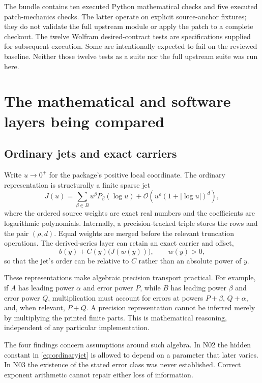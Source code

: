 \documentclass[11pt,letterpaper]{article}
\newcommand{\OO}{\mathcal O}
\begin{document}
The bundle contains ten executed Python mathematical checks and five executed patch-mechanics checks. The latter operate on explicit source-anchor fixtures; they do not validate the full upstream module or apply the patch to a complete checkout. The twelve Wolfram desired-contract tests are specifications supplied for subsequent execution. Some are intentionally expected to fail on the reviewed baseline. Neither those twelve tests as a suite nor the full upstream suite was run here.

\section{The mathematical and software layers being compared}
\subsection{Ordinary jets and exact carriers}
Write $u\to0^+$ for the package's positive local coordinate. The ordinary representation is structurally a finite sparse jet
\begin{equation}\label{eq:ordinaryjet}
 J(u)=\sum_{\beta\in B}u^\beta P_\beta(\log u)
       +\OO\!\left(u^\rho(1+|\log u|)^d\right),
\end{equation}
where the ordered source weights are exact real numbers and the coefficients are logarithmic polynomials. Internally, a precision-tracked triple stores the rows and the pair $(\rho,d)$. Equal weights are merged before the relevant truncation operations. The derived-series layer can retain an exact carrier and offset,
\begin{equation}\label{eq:carrier}
 b(y)+C(y)\bigl(J(w(y))\bigr),\qquad w(y)>0,
\end{equation}
so that the jet's order can be relative to $C$ rather than an absolute power of $y$.\cite{core,operations}

These representations make algebraic precision transport practical. For example, if $A$ has leading power $\alpha$ and error power $P$, while $B$ has leading power $\beta$ and error power $Q$, multiplication must account for errors at powers $P+\beta$, $Q+\alpha$, and, when relevant, $P+Q$. A precision representation cannot be inferred merely by multiplying the printed finite parts. This is mathematical reasoning, independent of any particular implementation.

The four findings concern assumptions around such algebra. In N02 the hidden constant in \eqref{eq:ordinaryjet} is allowed to depend on a parameter that later varies. In N03 the existence of the stated error class was never established. Correct exponent arithmetic cannot repair either loss of information.
\end{document}
